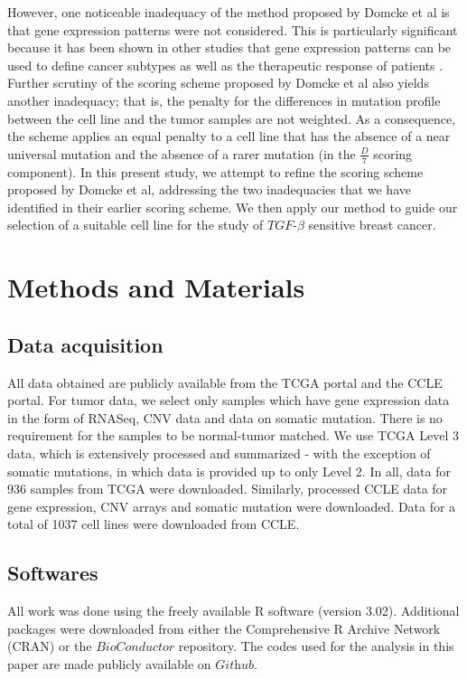 \documentclass[a4paper,12pt]{article}
\begin{document}
However, one noticeable inadequacy of the method proposed by Domcke et
al is that gene expression patterns were not considered. This is
particularly significant because it has been shown in other studies
that gene expression patterns can be used to define cancer subtypes as
well as the therapeutic response of patients \cite{Veer2002,Finetti2004,Finetti2005}. Further scrutiny of the scoring scheme proposed by Domcke et al
also yields another inadequacy; that is, the penalty for the
differences in mutation profile between the cell line and the tumor
samples are not weighted. As a consequence, the scheme applies an
equal penalty to a cell line that has the absence of a near universal mutation and the absence of a rarer mutation (in the
$\frac{D}{7}$ scoring component). In this present study, we attempt to
refine the scoring scheme proposed by Domcke et al, addressing the two
inadequacies that we have identified in their earlier scoring
scheme. We then apply our method to guide our selection of a suitable
cell line for the study of $\textit{TGF}$-$\beta$ sensitive breast cancer.

\section{Methods and Materials}
\subsection{Data acquisition}
All data obtained are publicly available from the TCGA portal and the
CCLE portal. For tumor data, we select only samples which have gene
expression data in the form of RNASeq, CNV data and data on somatic
mutation. There is no requirement for the samples to be normal-tumor
matched. We use TCGA Level 3 data, which is extensively processed and
summarized - with the exception of somatic mutations, in which data is
provided up to only Level 2. In all, data for 936 samples from TCGA were
downloaded. Similarly, processed CCLE data for gene expression, CNV
arrays and somatic mutation were downloaded. Data for a total of 1037 cell lines
were downloaded from CCLE.

\subsection{Softwares}
All work was done using the freely available R software (version
3.02). Additional packages were downloaded from either the
Comprehensive R Archive Network (CRAN) or the $\textit{BioConductor}$
repository. The codes used for the analysis in this paper are made
publicly available on $\textit{Github}$.
\end{document}

